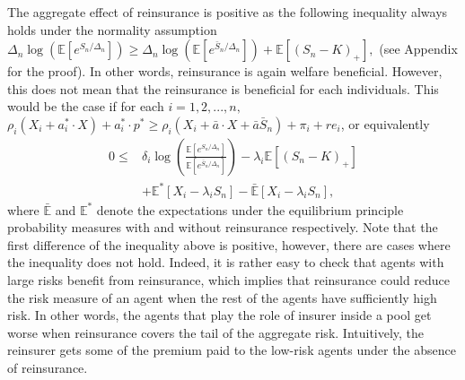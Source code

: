\documentclass[fleqn,mnsc,nonblindrev]{informs4}
\newcommand{\EE}{\mathbb{E}}
\begin{document}
\begin{remark}\label{rem:gains from reinsurance}
The aggregate effect of reinsurance is positive   {as the following inequality always holds under the normality assumption $\Delta_n\log(\EE[e^{S_n/\Delta_n}])\geq\Delta_n\log(\EE[e^{\bar{S}_n/\Delta_n}])+\EE[(S_n-K)_+],$ (see Appendix %
for the proof).}    {In other words, reinsurance is again welfare beneficial}. However, this does not mean that the reinsurance is beneficial for each individuals. This would be the case if for each $i=1,2,...,n,$   {$\rho_i(X_i+a_i^*\cdot X)+a_i^*\cdot p^*\geq \rho_i(X_i+\bar{a}\cdot X +\bar{a}\bar{S}_n) +\pi_i+re_i$}, or equivalently 
\begin{equation*}
\begin{aligned}
0\leq& \delta_i\log\left(\frac{\EE[e^{S_n/\Delta_n}]}{ \EE[e^{\bar{S}_n/\Delta_n}]} \right) -\lambda_i\EE[(S_n-K)_+]\\
&+\EE^*[X_i-\lambda_iS_n]-\bar{\EE}[X_i-\lambda_iS_n],   
\end{aligned}
\end{equation*}
where $\bar{\EE}$ and $\EE^*$ denote the expectations under the equilibrium principle probability measures with and without reinsurance respectively. Note that the first difference of the inequality above is positive, however, there are cases where the inequality does not hold. Indeed, it is rather easy to check that agents with large risks benefit from reinsurance, which implies that reinsurance could reduce the risk measure of an agent when the rest of the agents have sufficiently high risk. In other words, the agents that play the role of insurer inside a pool get worse when reinsurance covers the tail of the aggregate risk. Intuitively, the reinsurer gets some of the premium paid to the low-risk agents under the absence of reinsurance.
\end{remark}
\end{document}
